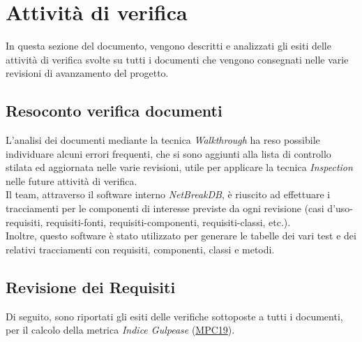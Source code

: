 \newpage

\section{Attività di verifica}
In questa sezione del documento, vengono descritti e analizzati gli esiti delle attività di verifica svolte su tutti i documenti che vengono consegnati nelle varie revisioni di avanzamento del progetto.




\subsection{Resoconto verifica documenti}

L’analisi dei documenti mediante la tecnica \textit{Walkthrough} ha reso possibile individuare alcuni errori frequenti, che si sono aggiunti alla lista di controllo stilata ed aggiornata nelle varie revisioni, utile per applicare la tecnica \textit{Inspection} nelle future attività di verifica.\\
Il team, attraverso il software interno \textit{NetBreakDB}, è riuscito ad effettuare i tracciamenti per le componenti di interesse previste da ogni revisione (casi d’uso-requisiti, requisiti-fonti, requisiti-componenti, requisiti-classi, etc.).\\
Inoltre, questo software è stato utilizzato per generare le tabelle dei vari test e dei relativi tracciamenti con requisiti, componenti, classi e metodi.
	
	\subsection{Revisione dei Requisiti}
	Di seguito, sono riportati gli esiti delle verifiche sottoposte a tutti i documenti, per il calcolo della metrica \textit{Indice Gulpease} (\hyperlink{MPC19}{MPC19}).
	

